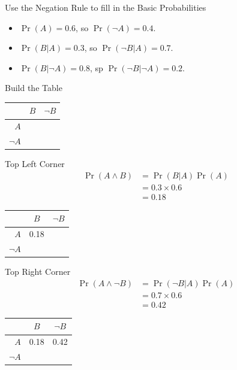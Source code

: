 \documentclass[
  ignorenonframetext,
]{beamer}
\providecommand{\tightlist}{%
  \setlength{\itemsep}{0pt}\setlength{\parskip}{0pt}}
\renewcommand{\,}{\text{, }}
\begin{document}
\begin{frame}{Use the Negation Rule to fill in the Basic Probabilities}
\protect\hypertarget{use-the-negation-rule-to-fill-in-the-basic-probabilities}{}
\begin{itemize}
\tightlist
\item
  \(\Pr(A) = 0.6\), so \(\Pr(\neg A) = 0.4\). \pause
\item
  \(\Pr(B | A) = 0.3\), so \(\Pr(\neg B | A) = 0.7\). \pause
\item
  \(\Pr(B | \neg A) = 0.8\), sp \(\Pr(\neg B | \neg A) = 0.2\).
\end{itemize}
\end{frame}

\begin{frame}{Build the Table}
\protect\hypertarget{build-the-table}{}
\begin{longtable}[]{@{}rcc@{}}
\toprule
& \(B\) & \(\neg B\) \\
\midrule
\endhead
\(A\) & & \\
\(\neg A\) & & \\
\bottomrule
\end{longtable}
\end{frame}

\begin{frame}{Top Left Corner}
\protect\hypertarget{top-left-corner}{}
\begin{align*}
\Pr(A \wedge B) &= \Pr(B | A) \Pr(A) \\
 &= 0.3 \times 0.6 \\
 &= 0.18
\end{align*}

\pause

\begin{longtable}[]{@{}rcc@{}}
\toprule
& \(B\) & \(\neg B\) \\
\midrule
\endhead
\(A\) & 0.18 & \\
\(\neg A\) & & \\
\bottomrule
\end{longtable}
\end{frame}

\begin{frame}{Top Right Corner}
\protect\hypertarget{top-right-corner}{}
\begin{align*}
\Pr(A \wedge \neg B) &= \Pr(\neg B | A) \Pr(A) \\
 &= 0.7 \times 0.6 \\
 &= 0.42
\end{align*}

\pause

\begin{longtable}[]{@{}rcc@{}}
\toprule
& \(B\) & \(\neg B\) \\
\midrule
\endhead
\(A\) & 0.18 & 0.42 \\
\(\neg A\) & & \\
\bottomrule
\end{longtable}
\end{frame}
\end{document}
